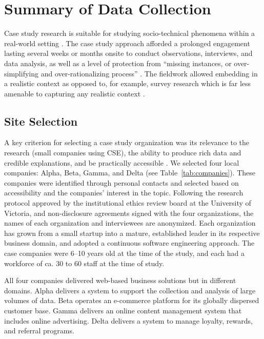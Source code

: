 \documentclass[smallextended]{svjour3}       %
\begin{document}
\appendix

\section{Summary of Data Collection}
\label{app:datacollection}

Case study research is suitable for studying socio-technical phenomena within a real-world setting  \cite[p. 1]{yin_case_2002}.
The case study approach afforded a prolonged engagement lasting several weeks or months onsite to conduct observations, interviews, and data analysis, as well as a level of protection from ``missing instances, or over-simplifying and over-rationalizing process'' \citep{ralph_tse_theories}. The fieldwork allowed embedding in a realistic context as opposed to, for example, survey research which is far less amenable to capturing any realistic context \citep{stol2018abc}.

\subsection{Site Selection}
\label{sec:sites}

A key criterion for selecting a case study organization was its relevance to the research (small companies using CSE), the ability to produce rich data and credible explanations, and be practically accessible \citep{miles1994qualitative}.
We selected four local companies: Alpha, Beta, Gamma, and Delta (see Table~\ref{tab:companies}).
These companies were identified through personal contacts and selected based on accessibility and the companies' interest in the topic. 
Following the research protocol approved by the institutional ethics review board at the University of Victoria, and non-disclosure agreements signed with the four organizations, the names of each organization and interviewees are anonymized.
Each organization has grown from a small startup into a mature, established leader in its respective business domain, and adopted a continuous software engineering approach.
The case companies were 6--10 years old at the time of the study, and each had a workforce of ca. 30 to 60 staff at the time of study.  

All four companies delivered web-based business solutions but in different domains. Alpha delivers a system to support the collection and analysis of large volumes of data. Beta operates an e-commerce platform for its globally dispersed customer base. Gamma delivers an online content management system that includes online advertising. Delta delivers a system to manage loyalty, rewards, and referral programs. 
\end{document}
